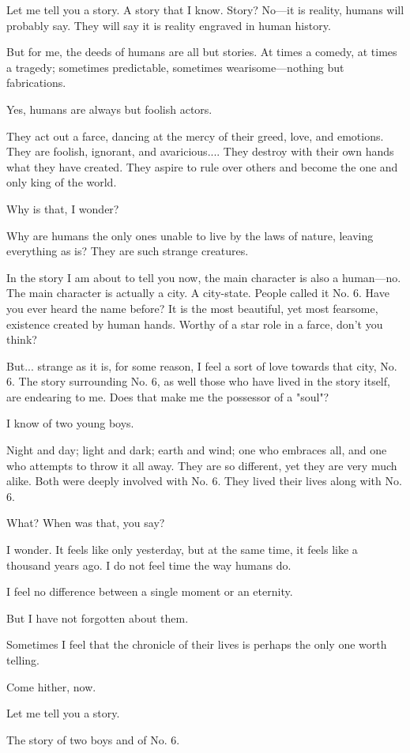 
Let me tell you a story. A story that I know. Story? No---it is reality,
humans will probably say. They will say it is reality engraved in human
history.

But for me, the deeds of humans are all but stories. At times a comedy,
at times a tragedy; sometimes predictable, sometimes wearisome---nothing
but fabrications.

Yes, humans are always but foolish actors.

They act out a farce, dancing at the mercy of their greed, love, and
emotions. They are foolish, ignorant, and avaricious.... They destroy
with their own hands what they have created. They aspire to rule over
others and become the one and only king of the world.

Why is that, I wonder?

Why are humans the only ones unable to live by the laws of nature,
leaving everything as is? They are such strange creatures.

In the story I am about to tell you now, the main character is also a
human---no. The main character is actually a city. A city-state. People
called it No. 6. Have you ever heard the name before? It is the most
beautiful, yet most fearsome, existence created by human hands. Worthy
of a star role in a farce, don't you think?

But... strange as it is, for some reason, I feel a sort of love towards
that city, No. 6. The story surrounding No. 6, as well those who have
lived in the story itself, are endearing to me. Does that make me the
possessor of a "soul"?

I know of two young boys.

Night and day; light and dark; earth and wind; one who embraces all, and
one who attempts to throw it all away. They are so different, yet they
are very much alike. Both were deeply involved with No. 6. They lived
their lives along with No. 6.

What? When was that, you say?

I wonder. It feels like only yesterday, but at the same time, it feels
like a thousand years ago. I do not feel time the way humans do.

I feel no difference between a single moment or an eternity.

But I have not forgotten about them.

Sometimes I feel that the chronicle of their lives is perhaps the only
one worth telling.

Come hither, now.

Let me tell you a story.

The story of two boys and of No. 6.